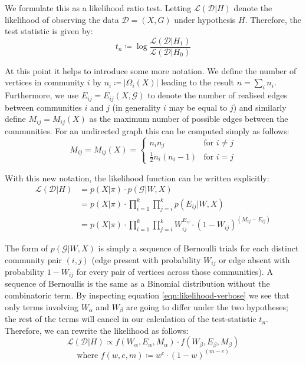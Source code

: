 \documentclass[]{article}
\newcommand{\Dcal}{\mathcal{D}}
\newcommand{\Gcal}{\mathcal{G}}
\newcommand{\lik}{\mathcal{L}}
\begin{document}
We formulate this as a likelihood ratio test. Letting $\lik(\Dcal | H)$ denote the likelihood of observing the data $\Dcal = (X, G)$ under hypothesis $H$. Therefore, the test statistic is given by:
%
\begin{equation}
	t_n \coloneqq \log \frac{\lik(\Dcal | H_1)}{\lik(\Dcal | H_0)}
	\label{eqn:test-statistic-start}
\end{equation}

At this point it helps to introduce some more notation. We define the number of vertices in community $i$ by $n_i \coloneqq |\Omega_i(X)|$ leading to the result $n = \sum_i n_i$. Furthermore, we use $E_{ij} = E_{ij}(X, \Gcal)$ to denote the number of realised edges between communities $i$ and $j$ (in generality $i$ may be equal to $j$) and similarly define $M_{ij} = M_{ij}(X)$ as the maximum number of possible edges between the communities. For an undirected graph this can be computed simply as follows:
%
\begin{equation}
	M_{ij} = M_{ij} (X) = \begin{cases}
		n_i n_j &\text{for } i \neq j \\
		\frac{1}{2}n_i (n_i - 1) &\text{for } i = j
	\end{cases}
\end{equation}

With this new notation, the likelihood function can be written explicitly:
%
\begin{align}
\lik(\Dcal | H) &= p(X| \pi) \cdot p(\Gcal | W, X) \nonumber \\
&= p(X | \pi) \cdot \prod_{i=1}^{k} \prod_{j=i}^{k} p(E_{ij} | W, X) \nonumber \\
&= p(X | \pi) \cdot \prod_{i=1}^{k} \prod_{j=i}^{k} W_{ij} ^ {E_{ij}} \cdot \left( 1 - W_{ij} \right) ^ {(M_{ij} - E_{ij})}
\label{eqn:likelihood-verbose}
\end{align}

The form of $p(\Gcal | W, X)$ is simply a sequence of Bernoulli trials for each distinct community pair $(i, j)$ (edge present with probability $W_{ij}$ or edge absent with probability $1 - W_{ij}$ for every pair of vertices across those communities). A sequence of Bernoullis is the same as a Binomial distribution without the combinatoric term. By inspecting equation \ref{eqn:likelihood-verbose} we see that only terms involving $W_{\alpha}$ and $W_{\beta}$ are going to differ under the two hypotheses; the rest of the terms will cancel in our calculation of the test-statistic $t_n$. Therefore, we can rewrite the likelihood as follows:
%
\begin{equation}
	\lik (\Dcal | H) \propto f (W_\alpha, E_\alpha, M_\alpha) \cdot f (W_\beta, E_\beta, M_\beta)
\end{equation} 
\begin{equation}
	\textrm{where } f (w, e, m) \coloneqq w^e \cdot (1-w)^{(m - e)}
	\label{eqn:f-defn}
\end{equation}
\end{document}
